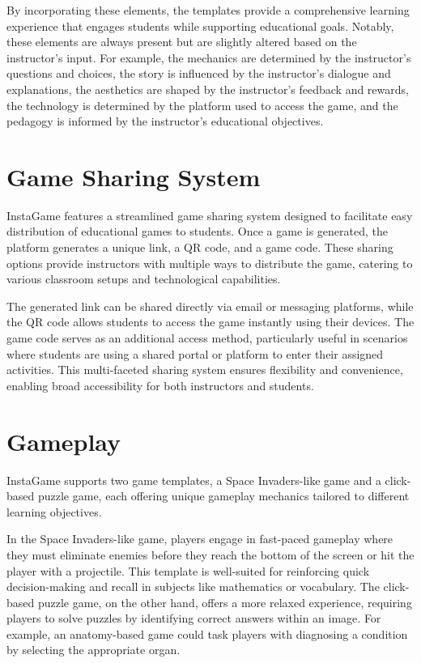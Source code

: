 By incorporating these elements, the templates provide a comprehensive learning experience that engages students while supporting educational goals. Notably, these elements are always present but are slightly altered based on the instructor's input. For example, the mechanics are determined by the instructor's questions and choices, the story is influenced by the instructor's dialogue and explanations, the aesthetics are shaped by the instructor's feedback and rewards, the technology is determined by the platform used to access the game, and the pedagogy is informed by the instructor's educational objectives.



\section{Game Sharing System}

InstaGame features a streamlined game sharing system designed to facilitate easy distribution of educational games to students. Once a game is generated, the platform generates a unique link, a QR code, and a game code. These sharing options provide instructors with multiple ways to distribute the game, catering to various classroom setups and technological capabilities.

The generated link can be shared directly via email or messaging platforms, while the QR code allows students to access the game instantly using their devices. The game code serves as an additional access method, particularly useful in scenarios where students are using a shared portal or platform to enter their assigned activities. This multi-faceted sharing system ensures flexibility and convenience, enabling broad accessibility for both instructors and students.


\section{Gameplay}

InstaGame supports two game templates, a Space Invaders-like game and a click-based puzzle game, each offering unique gameplay mechanics tailored to different learning objectives.

In the Space Invaders-like game, players engage in fast-paced gameplay where they must eliminate enemies before they reach the bottom of the screen or hit the player with a projectile. This template is well-suited for reinforcing quick decision-making and recall in subjects like mathematics or vocabulary. The click-based puzzle game, on the other hand, offers a more relaxed experience, requiring players to solve puzzles by identifying correct answers within an image. For example, an anatomy-based game could task players with diagnosing a condition by selecting the appropriate organ.

